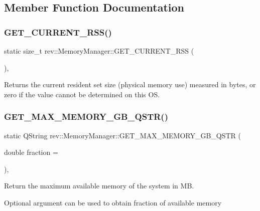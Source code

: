 \subsection{Member Function Documentation}
\mbox{\label{classrev_1_1_memory_manager_a599246d380e0d127a069076b706d6c86}} 
\subsubsection{\texorpdfstring{GET\_CURRENT\_RSS()}{GET\_CURRENT\_RSS()}}
{\footnotesize\ttfamily static size\+\_\+t rev\+::\+Memory\+Manager\+::\+G\+E\+T\+\_\+\+C\+U\+R\+R\+E\+N\+T\+\_\+\+R\+SS (\begin{DoxyParamCaption}{ }\end{DoxyParamCaption})\hspace{0.3cm}{\ttfamily [inline]}, {\ttfamily [static]}}

Returns the current resident set size (physical memory use) measured in bytes, or zero if the value cannot be determined on this OS. \mbox{\label{classrev_1_1_memory_manager_aaee5207169db829d2e942f54c83cd138}} 
\subsubsection{\texorpdfstring{GET\_MAX\_MEMORY\_GB\_QSTR()}{GET\_MAX\_MEMORY\_GB\_QSTR()}}
{\footnotesize\ttfamily static Q\+String rev\+::\+Memory\+Manager\+::\+G\+E\+T\+\_\+\+M\+A\+X\+\_\+\+M\+E\+M\+O\+R\+Y\+\_\+\+G\+B\+\_\+\+Q\+S\+TR (\begin{DoxyParamCaption}\item[{double}]{fraction = {} }\end{DoxyParamCaption})\hspace{0.3cm}{\ttfamily [inline]}, {\ttfamily [static]}}



Return the maximum available memory of the system in MB. 

Optional argument can be used to obtain fraction of available memory \mbox{\label{classrev_1_1_memory_manager_a777e4d9a3e92912ea698838bdd631f3c}} 
